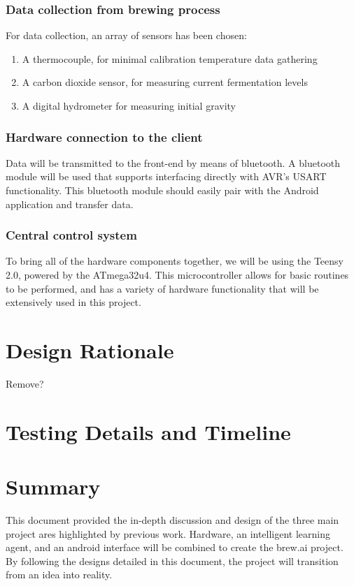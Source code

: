 \documentclass[draftclsnofoot,onecolumn,letterpaper,10pt]{IEEEtran}
\begin{document}
\subsubsection{Data collection from brewing process}
For data collection, an array of sensors has been chosen:
\begin{enumerate}
	\item A thermocouple, for minimal calibration temperature data gathering
	\item A carbon dioxide sensor, for measuring current fermentation levels
	\item A digital hydrometer for measuring initial gravity
\end{enumerate}
\subsubsection{Hardware connection to the client}
Data will be transmitted to the front-end by means of bluetooth. A bluetooth module will be used that supports interfacing directly with AVR's
USART functionality. This bluetooth module should easily pair with the Android application and transfer data.

\subsubsection{Central control system}
To bring all of the hardware components together, we will be using the Teensy 2.0, powered by the ATmega32u4. This microcontroller allows for basic
routines to be performed, and has a variety of hardware functionality that will be extensively used in this project.

\section{Design Rationale}
Remove?

\section{Testing Details and Timeline}

\section{Summary}
This document provided the in-depth discussion and design of the three main project ares highlighted by previous work.
Hardware, an intelligent learning agent, and an android interface will be combined to create the brew.ai project.
By following the designs detailed in this document, the project will transition from an idea into reality.



\end{document}
